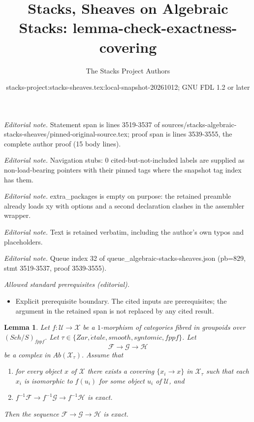 \documentclass[10pt,a4paper]{amsart}
\title{Stacks, Sheaves on Algebraic Stacks: lemma-check-exactness-covering}
\author{The Stacks Project Authors}
\date{stacks-project:stacks-sheaves.tex:local-snapshot-20261012; GNU FDL 1.2 or later}
\theoremstyle{plain}
\newtheorem{lemma}[subsection]{Lemma}
\theoremstyle{definition}
\theoremstyle{remark}
\numberwithin{equation}{subsection}
\def\Sch{\mathit{Sch}}
\def\etale{{\acute{e}tale}}
\begin{document}
\maketitle
\noindent\textit{Editorial note.} Statement span is lines 3519-3537 of sources/stacks-algebraic-stacks-sheaves/pinned-original-source.tex; proof span is lines 3539-3555, the complete author proof (15 body lines).\par\medskip
\noindent\textit{Editorial note.} Navigation stubs: 0 cited-but-not-included labels are supplied as non-load-bearing pointers with their pinned tags where the snapshot tag index has them.\par\medskip
\noindent\textit{Editorial note.} extra\_packages is empty on purpose: the retained preamble already loads xy with options and a second declaration clashes in the assembler wrapper.\par\medskip
\noindent\textit{Editorial note.} Text is retained verbatim, including the author's own typos and placeholders.\par\medskip
\noindent\textit{Editorial note.} Queue index 32 of queue\_algebraic-stacks-sheaves.json (pb=829, stmt 3519-3537, proof 3539-3555).\par\medskip
\noindent\textit{Allowed standard prerequisites (editorial).}\begin{itemize}
\item Explicit prerequisite boundary. The cited inputs are prerequisites; the argument in the retained span is not replaced by any cited result.
\end{itemize}\medskip
\begin{lemma}
\label{lemma-check-exactness-covering}
Let $f : \mathcal{U} \to \mathcal{X}$ be a $1$-morphism of categories fibred
in groupoids over $(\Sch/S)_{fppf}$. Let
$\tau \in \{Zar, \etale, smooth, syntomic, fppf\}$.
Let
$$
\mathcal{F} \to \mathcal{G} \to \mathcal{H}
$$
be a complex in $\textit{Ab}(\mathcal{X}_\tau)$. Assume that
\begin{enumerate}
\item for every object $x$ of $\mathcal{X}$ there exists a covering
$\{x_i \to x\}$ in $\mathcal{X}_\tau$ such that each $x_i$ is isomorphic
to $f(u_i)$ for some object $u_i$ of $\mathcal{U}$, and
\item $f^{-1}\mathcal{F} \to f^{-1}\mathcal{G} \to f^{-1}\mathcal{H}$ is exact.
\end{enumerate}
Then the sequence $\mathcal{F} \to \mathcal{G} \to \mathcal{H}$
is exact.
\end{lemma}
\end{document}
